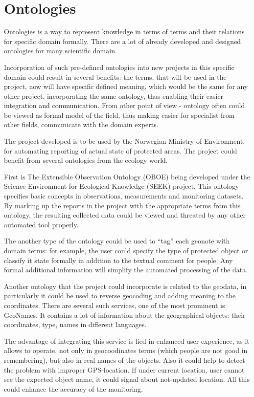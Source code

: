 \documentclass[12pt,a4paper]{article}
\begin{document}
\section{Ontologies}
Ontologies is a way to represent knowledge in terms of terms and their
relations for specific domain formally. There are a lot of already developed
and designed ontologies for many scientific domain.

Incorporation of such pre-defined ontologies into new projects in this specific domain could
result in several benefits: the terms, that will be used in the project,
now will have specific defined meaning, which would be the same for
any other project, incorporating the same ontology, thus enabling their
easier integration and communication. From other point of view - ontology
often could be viewed as formal model of the field, thus making easier for
specialist from other fields, communicate with the domain experts.

The project developed is to be used by the Norwegian Ministry of Environment,
for automating reporting of actual state of protected areas. The project
could benefit from several ontologies from the ecology world.

First is The Extensible Observation Ontology (OBOE) being developed under the Science
Environment for Ecological Knowledge (SEEK) project. This ontology
specifies basic concepts in observations, measurements and monitoring datasets.
By marking up the reports in the project with the appropriate terms from this
ontology, the resulting collected data could be viewed and threated by any other
automated tool properly.

The another type of the ontology could be used to ``tag'' each geonote with
domain terms: for example, the user could specify the type of protected object
or classify it state formally in addition to the textual comment for people.
Any formal additional information will simplify the automated processing of
the data.

Another ontology that the project could incorporate is related to the geodata,
in particularly it could be used to reverse geocoding and adding meaning to
the coordinates. There are several such services, one of the most prominent is
GeoNames. It contains a lot of information about the geographical objects:
their coordinates, type, names in different languages.

The advantage of integrating this service is lied in enhanced user experience,
as it allows to operate, not only in geocoodinates terms (which people are not good
in remembering), but also in real names of the objects.
Also it could help to detect the problem with improper GPS-location. If under
current location, user cannot see the expected object name, it could signal
about not-updated location. All this could enhance the accuracy of the monitoring.
\end{document}
